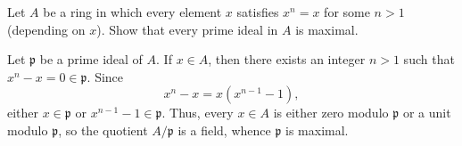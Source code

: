 \begin{exercise}
Let \(A\) be a ring in which every element \(x\) satisfies \(x^n = x\) for some \(n > 1\) (depending on \(x\)).
Show that every prime ideal in \(A\) is maximal.
\end{exercise}

\begin{solution}
Let \(\mathfrak p\) be a prime ideal of \(A\).
If \(x \in A\), then there exists an integer \(n > 1\) such that \(x^n - x = 0 \in \mathfrak p\).
Since
\begin{equation*}
x^n - x = x(x^{n-1} - 1),
\end{equation*}
either \(x\in\mathfrak p\) or \(x^{n-1} - 1 \in \mathfrak p\).
Thus, every \(x \in A\) is either zero modulo \(\mathfrak p\) or a unit modulo \(\mathfrak p\), so the quotient \(A/\mathfrak p\) is a field, whence \(\mathfrak p\) is maximal.
\end{solution}